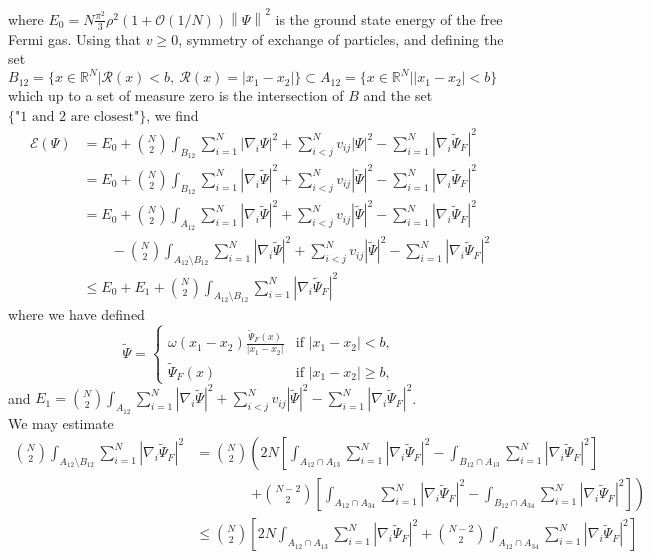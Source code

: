 \documentclass[a4paper,11pt]{article}
\newcommand{\norm}[1]{\left\lVert #1 \right\rVert}
\newcommand{\abs}[1]{\left\lvert #1 \right\rvert}
\newcommand{\R}{\mathbb{R}}
\newcommand{\rr}{\mathcal{R}}
\numberwithin{equation}{section}
\begin{document}
	where $ E_0=N\frac{\pi^2}{3}\rho^2(1+\mathcal{O}(1/N))\norm{\Psi}^2 $ is the ground state energy of the free Fermi gas. Using that $ v\geq0 $, symmetry of exchange of particles, and defining the set $ B_{12}=\{x\in\R^N \vert \rr(x)<b,\ \rr(x)=\abs{x_1-x_2} \}\subset A_{12}=\{x\in\R^N\vert \abs{x_1-x_2}<b\} $ which up to a set of measure zero is the intersection of $ B $ and the set $ \{\text{"1 and 2 are closest"}\} $, we find \begin{equation}
	\begin{aligned}
	\mathcal{E}(\Psi)&=E_0+\binom{N}{2}\int_{B_{12}} \sum_{i=1}^{N}\abs{\nabla_i\Psi}^2+\sum_{i<j}^{N}v_{ij}\abs{\Psi}^2-\sum_{i=1}^{N}\abs{\nabla_i\tilde{\Psi}_F}^2\\&
	=E_0+\binom{N}{2}\int_{B_{12}} \sum_{i=1}^{N}\abs{\nabla_i\tilde{\Psi}}^2+\sum_{i<j}^{N}v_{ij}\abs{\tilde{\Psi}}^2-\sum_{i=1}^{N}\abs{\nabla_i\tilde{\Psi}_F}^2\\&
	=E_0+\binom{N}{2}\int_{A_{12}} \sum_{i=1}^{N}\abs{\nabla_i\tilde{\Psi}}^2+\sum_{i<j}^{N}v_{ij}\abs{\tilde{\Psi}}^2-\sum_{i=1}^{N}\abs{\nabla_i\tilde{\Psi}_F}^2\\&\qquad
	-\binom{N}{2}\int_{A_{12}\setminus B_{12}} \sum_{i=1}^{N}\abs{\nabla_i\tilde{\Psi}}^2+\sum_{i<j}^{N}v_{ij}\abs{\tilde{\Psi}}^2-\sum_{i=1}^{N}\abs{\nabla_i\tilde{\Psi}_F}^2\\&
	\leq E_0+E_1+\binom{N}{2}\int_{A_{12}\setminus B_{12}}\sum_{i=1}^{N}\abs{\nabla_i\tilde{\Psi}_F}^2
	\end{aligned}
	\end{equation}
	where we have defined \begin{equation*}
		\tilde{\Psi}=\begin{cases}
		\omega(x_1-x_2)\frac{\tilde{\Psi}_F(x)}{\abs{x_1-x_2}}& \text{if }\abs{x_1-x_2}<b,\\
		\tilde{\Psi}_F(x)&\text{if }\abs{x_1-x_2}\geq b,
		\end{cases}
	\end{equation*} and $ E_1=\binom{N}{2}\int_{A_{12}} \sum_{i=1}^{N}\abs{\nabla_i\tilde{\Psi}}^2+\sum_{i<j}^{N}v_{ij}\abs{\tilde{\Psi}}^2-\sum_{i=1}^{N}\abs{\nabla_i\tilde{\Psi}_F}^2 $.\\
	We may estimate \begin{equation}
	\begin{aligned}
	\binom{N}{2}\int_{A_{12}\setminus B_{12}}\sum_{i=1}^{N}\abs{\nabla_i\tilde{\Psi}_F}^2&=\binom{N}{2}\left(2N\left[\int_{A_{12}\cap A_{13}}\sum_{i=1}^{N}\abs{\nabla_i\tilde{\Psi}_F}^2-\int_{B_{12}\cap A_{13}}\sum_{i=1}^{N}\abs{\nabla_i\tilde{\Psi}_F}^2\right]\right.\\
	&\qquad\qquad\left.+\binom{N-2}{2}\left[\int_{A_{12}\cap A_{34}}\sum_{i=1}^{N}\abs{\nabla_i\tilde{\Psi}_F}^2-\int_{B_{12}\cap A_{34}}\sum_{i=1}^{N}\abs{\nabla_i\tilde{\Psi}_F}^2\right]\right)\\
	&\leq \binom{N}{2}\left[2N\int_{A_{12}\cap A_{13}}\sum_{i=1}^{N}\abs{\nabla_i\tilde{\Psi}_F}^2+\binom{N-2}{2}\int_{A_{12}\cap A_{34}}\sum_{i=1}^{N}\abs{\nabla_i\tilde{\Psi}_F}^2\right]
	\end{aligned}
	\end{equation}
\end{document}
